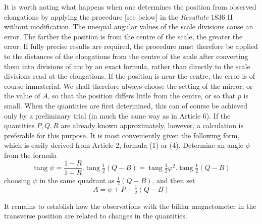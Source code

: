 It is worth noting what happens when one determines the position from observed elongations by applying the procedure [see below] in the \textit{Resultate} 1836 II
without modification. The unequal angular values of the scale divisions cause an error. The farther the position is from the centre of the scale, the greater the error. If fully precise results are required, the procedure must therefore be applied to the distances of the elongations from the centre of the scale after converting them into divisions of arc by an exact formula, rather than directly to the scale divisions read at the elongations. If the position is near the centre, the error is of course immaterial. We shall therefore always choose the setting of the mirror, or the value of $A$, so that the position differs little from the centre, or so that $p$ is small. When the quantities are first determined, this can of course be achieved only by a preliminary trial (in much the same way as in Article 6). If the quantities $P,Q,R$ are already known approximately, however, a calculation is preferable for this purpose. It is most conveniently given the following form, which is easily derived from Article 2, formula (1) or (4). Determine an angle $\psi$ from the formula
\[
\operatorname{tang}\psi=\frac{1-R}{1+R}.\operatorname{tang}\tfrac12(Q-B)=\operatorname{tang}\tfrac12\varphi^2.\operatorname{tang}\tfrac12(Q-B)
\]
choosing $\psi$ in the same quadrant as $\tfrac12(Q-B)$, and then set
\[
A=\psi+P-\tfrac12(Q-B)
\]

It remains to establish how the observations with the bifilar magnetometer in the transverse position are related to changes in the quantities.

